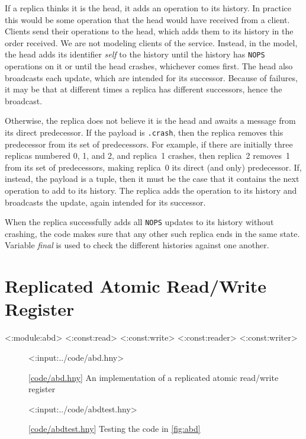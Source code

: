\documentclass{report}
\newcommand{\harmonylink}[1]{%
[\href{https://harmony.cs.cornell.edu/#1}{\underline{#1}}]%
}
\newenvironment{code}{
\tcolorbox
}{
\endtcolorbox
}
\begin{document}
{If a replica thinks it is the head, it adds an operation to its
history.
In practice this would be some operation that the head would have received
from a client.  Clients send their operations to the head, which adds them
to its history in the order received.
We are not modeling clients of the service.
Instead, in the model, the head adds its identifier \textit{self} to the
history until the
history has \texttt{NOPS} operations on it or until the head crashes,
whichever comes first.  The head also broadcasts each update, which
are intended for its successor.  Because of failures, it may be that
at different times a replica has different successors, hence the
broadcast.

Otherwise, the replica does not believe it is the head and
awaits a message from its direct predecessor.
If the payload is \texttt{.crash}, then the replica removes this
predecessor from its set of predecessors.  For example, if there
are initially three replicas numbered 0, 1, and 2, and replica~1
crashes, then replica~2 removes~1 from its set of predecessors, making
replica~0 its direct (and only) predecessor.  If, instead, the payload
is a tuple, then it must be the case that it contains the next operation
to add to its history.  The replica adds the operation to its history
and broadcasts the update, again intended for its successor.

When the replica successfully adds all \texttt{NOPS} updates to its
history without crashing, the code makes sure that any other such replica
ends in the same state.  Variable \textit{final} is used to check the
different histories against one another.

\chapter{Replicated Atomic Read/Write Register}
\label{ch:abd}

<{:module:abd}>
<{:const:read}>
<{:const:write}>
<{:const:reader}>
<{:const:writer}>

\begin{figure}
\begin{code}
<{:input:../code/abd.hny}>
\end{code}
\caption{\harmonylink{code/abd.hny} An implementation of a replicated atomic read/write register}
\label{fig:abd}
\end{figure}

\begin{figure}
\begin{code}
<{:input:../code/abdtest.hny}>
\end{code}
\caption{\harmonylink{code/abdtest.hny} Testing the code in \autoref{fig:abd}}
\label{fig:abdtest}
\end{figure}

}
\end{document}
